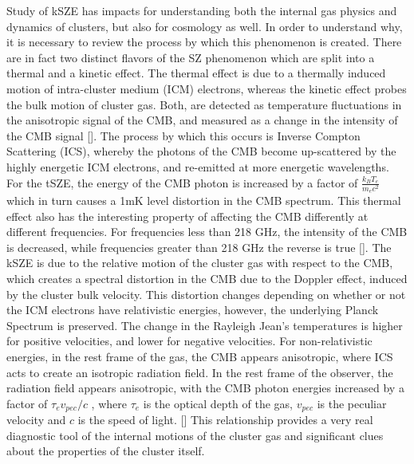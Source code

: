 \documentclass[manuscript]{aastex}
\begin{document}
Study of kSZE has impacts for understanding both the internal gas physics and dynamics of clusters, but also for cosmology as well. In order to understand why, it is necessary to review the process by which this phenomenon is created. There are in fact two distinct flavors of the SZ phenomenon which are split into a thermal and a kinetic effect. The thermal effect is due to a thermally induced motion of intra-cluster medium (ICM) electrons, whereas the kinetic effect probes the bulk motion of cluster gas. Both, are detected as temperature fluctuations in the anisotropic signal of the CMB, and measured as a change in the intensity of the CMB signal [\cite{Sunyaev1970}].  The process by which this occurs is Inverse Compton Scattering (ICS), whereby the photons of the CMB become up-scattered by the highly energetic ICM electrons, and re-emitted at more energetic wavelengths. For the tSZE, the energy of the CMB photon is increased by a factor of \(\frac{k_{B}T_{e}}{m_{e}c^{2}}\) which in turn causes a 1mK level distortion in the CMB spectrum. This thermal effect also has the interesting property of affecting the CMB differently at different frequencies. For frequencies less than 218 GHz, the intensity of the CMB is decreased, while frequencies greater than 218 GHz the reverse is true [\cite{Carlstrom2002}]. The kSZE is due to the relative motion of the cluster gas with respect to the CMB, which creates a spectral distortion in the CMB due to the Doppler effect, induced by the cluster bulk velocity.  This distortion changes depending on whether or not the ICM electrons have relativistic energies, however, the underlying Planck Spectrum is preserved. The change in the Rayleigh Jean's temperatures is higher for positive velocities, and lower for negative velocities. For non-relativistic energies, in the rest frame of the gas, the CMB appears anisotropic, where ICS acts to create an isotropic radiation field. In the rest frame of the observer, the radiation field appears anisotropic, with the CMB photon energies increased by a factor of \(\tau_{e} v_{pec} / c\) , where \(\tau_{e}\) is the optical depth of the gas, \(v_{pec}\) is the peculiar velocity and \(c\) is the speed of light. [\cite{Birkinshaw1999}] This relationship provides a very real diagnostic tool of the internal motions of the cluster gas and significant clues about the properties of the cluster itself.
\end{document}
